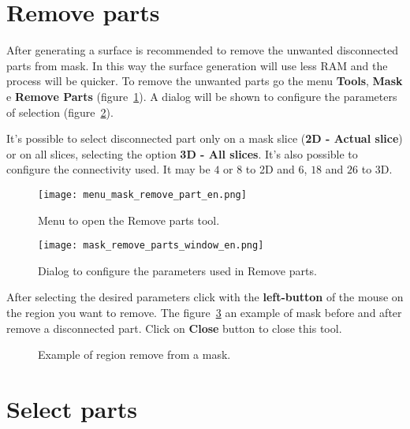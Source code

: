 \section{Remove parts}

After generating a surface is recommended to remove the unwanted disconnected parts from mask. In this way the surface generation will use less RAM and the process will be quicker.  To remove the unwanted parts go the menu  \textbf{Tools}, \textbf{Mask} e \textbf{Remove Parts} (figure~\ref{fig:menu_mask_remove_part}). A dialog will be shown to configure the parameters of selection (figure~\ref{fig:mask_remove_parts_window}).

It's possible to select disconnected part only on a mask slice (\textbf{2D - Actual slice}) or on all slices, selecting the option \textbf{3D - All slices}. It's also possible to configure the connectivity used. It may be $4$ or $8$ to 2D and $6$, $18$ and $26$ to 3D.

\begin{figure}[!htb]
\centering
\texttt{[image: menu\_mask\_remove\_part\_en.png]}
\caption{Menu to open the Remove parts tool.}
\label{fig:menu_mask_remove_part}
\end{figure}

\begin{figure}[!htb]
\centering
\texttt{[image: mask\_remove\_parts\_window\_en.png]}
\caption{Dialog to configure the parameters used in Remove parts.}
\label{fig:mask_remove_parts_window}
\end{figure}

After selecting the desired parameters click with the \textbf{left-button} of the mouse on the region you want to remove. The figure~\ref{fig:mask_removed_part} an example of mask before and after remove a disconnected part. Click on \textbf{Close} button to close this tool.

\begin{figure}[!htb]
  \centering
    \qquad
  \hfill
  \caption{Example of region remove from a mask.}
  \label{fig:mask_removed_part}
\end{figure}

\section{Select parts}

